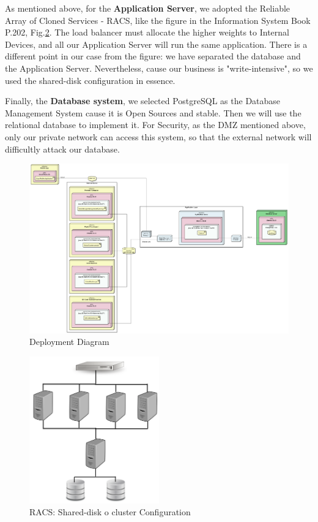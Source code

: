 \documentclass[a4paper,12pt]{report}
\begin{document}
As mentioned above, for the \textbf{Application Server}, we adopted the Reliable Array of Cloned Services - RACS, like the figure in the Information System Book P.202\cite{SistemiInformativi}, Fig.\ref{fig:RACS}.
The load balancer must allocate the higher weights to Internal Devices, and all our Application Server will run the same application.
There is a different point in our case from the figure: we have separated the database and the Application Server.
Nevertheless, cause our business is "write-intensive", so we used the shared-disk configuration in essence.

Finally, the \textbf{Database system}, we selected PostgreSQL as the Database Management System cause it is Open Sources and stable.
Then we will use the relational database to implement it.
For Security, as the DMZ mentioned above, only our private network can access this system, so that the external network will difficultly attack our database.


\begin{figure}
	\centering
	\includegraphics[width=1.25\textwidth]{deployment_diagram}
	\caption{Deployment Diagram}
	\centering
	\label{fig:deployment_diagram}
\end{figure}

\begin{figure}
	\centering
	\includegraphics[width=0.5\textwidth]{RACS}
	\caption{RACS: Shared-disk o cluster Configuration}
	\centering
	\label{fig:RACS}
\end{figure}
\end{document}
